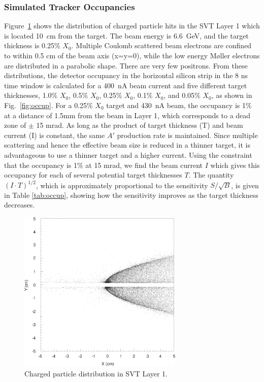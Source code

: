\subsubsection{Simulated Tracker Occupancies}

Figure~\ref{fig:scatt} shows the distribution of charged particle hits in the SVT Layer 1 
which is located 
10~cm from the target. The beam energy is 6.6~GeV, and the target thickness is 
0.25\% $X_0$. Multiple Coulomb scattered beam electrons are confined to within 0.5 cm of the beam axis
(x=y=0), while the low energy M{\o}ller electrons are distributed in a parabolic shape. There are
very few positrons. From these distributions, the detector occupancy in the horizontal silicon strip
in the 8 ns time window is calculated for a 400~nA beam current and five different target
thicknesses, 1.0\% $X_0$, 0.5\% $X_0$, 0.25\% $X_0$, 0.1\% $X_0$, and 0.05\% $X_0$, as shown
in Fig.~\ref{fig:occup}. 
For a 0.25\% $X_0$ target and 430~nA beam, the occupancy is 
1\% at a distance of 1.5mm from the beam in Layer 1, which corresponds to a dead zone of $\pm$ 15
mrad. As long as the product of target thickness (T) and beam current (I) is constant, the same 
$A'$ production rate is maintained. Since multiple scattering and hence the effective beam size 
is reduced in a thinner target, it is advantageous to use a thinner target and a higher current.
Using the constraint that the occupancy is 1\% at 15 mrad, we find the beam current $I$ which 
gives this occupancy for each of several potential target thicknesses $T$. The quantity 
$(I\cdot T)^{1/2}$, which is approximately proportional to the sensitivity $S/\sqrt{B}$, is
given in Table \ref{tab:occup}, showing how the sensitivity improves as the target thickness 
decreases.

\begin{figure}[ht]
\includegraphics[width= 0.7\textwidth]{performance/scatterplot.png}
\caption{\small{Charged particle distribution in SVT Layer 1.}}
\label{fig:scatt}
\end{figure}

